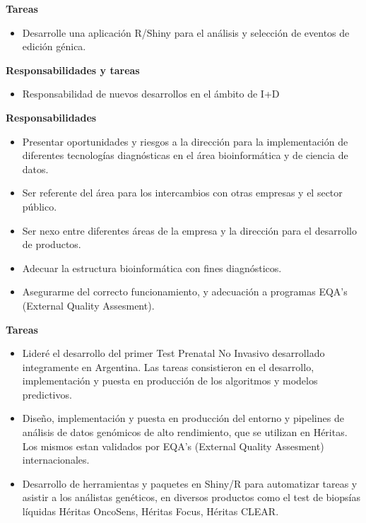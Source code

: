 \documentclass[10pt,a4paper,ragged2e]{altacv}
\begin{document}
\textbf{Tareas}
\begin{itemize}
\item Desarrolle una aplicación R/Shiny para el análisis y selección de eventos de edición génica.
\end{itemize}

\divider


\textbf{Responsabilidades y tareas}
\begin{itemize}
\item Responsabilidad de nuevos desarrollos en el ámbito de I+D
\end{itemize}

\divider


\textbf{Responsabilidades}
\begin{itemize}
\item Presentar oportunidades y riesgos a la dirección para la implementación de diferentes tecnologías diagnósticas en el área bioinformática y de ciencia de datos.
\item Ser referente del área para los intercambios con otras empresas y el sector público.
\item Ser nexo entre diferentes áreas de la empresa y la dirección para el desarrollo de productos.
\item Adecuar la estructura bioinformática con fines diagnósticos.
\item Asegurarme del correcto funcionamiento, y adecuación a programas EQA's (External Quality Assesment).
\end{itemize}

\textbf{Tareas}
\begin{itemize}
\item Lideré el desarrollo del primer Test Prenatal No Invasivo desarrollado integramente en Argentina. Las tareas consistieron en el desarrollo, implementación y puesta en producción de los algoritmos y modelos predictivos.
\item Diseño, implementación y puesta en producción del entorno y pipelines de análisis de datos genómicos de alto rendimiento, que se utilizan en Héritas. Los mismos estan validados por EQA's (External Quality Assesment) internacionales.
\item Desarrollo de herramientas y paquetes en Shiny/R para automatizar tareas y asistir a los análistas genéticos, en diversos productos como el test de biopsías líquidas Héritas OncoSens, Héritas Focus, Héritas CLEAR.
\end{itemize}
\end{document}
